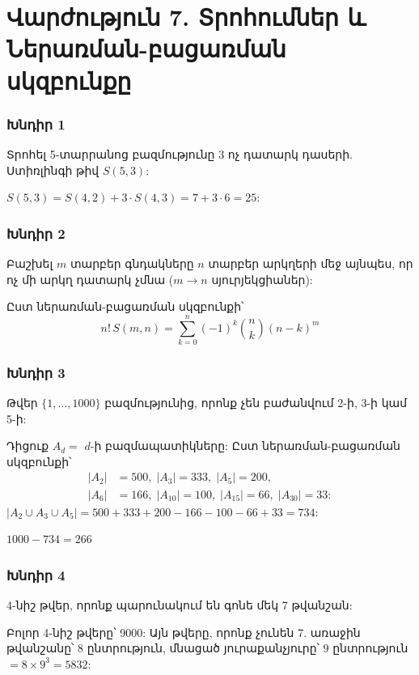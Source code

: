 
\section*{Վարժություն 7. Տրոհումներ և Ներառման-բացառման սկզբունքը}

\subsubsection*{Խնդիր 1}
Տրոհել 5-տարրանոց բազմությունը 3 ոչ դատարկ դասերի. Ստիռլինգի թիվ $S(5,3)$:

$S(5,3) = S(4,2)+3\cdot S(4,3) = 7 + 3\cdot 6 = \boxed{25}$:

\subsubsection*{Խնդիր 2}
Բաշխել $m$ տարբեր գնդակները $n$ տարբեր արկղերի մեջ այնպես, որ ոչ մի արկղ դատարկ չմնա ($m\to n$ սյուրյեկցիաներ):

Ըստ ներառման-բացառման սկզբունքի՝
\[
  \boxed{n!\,S(m,n) = \sum_{k=0}^{n}(-1)^k\binom{n}{k}(n-k)^m}
\]

\subsubsection*{Խնդիր 3}
Թվեր $\{1,\dots,1000\}$ բազմությունից, որոնք չեն բաժանվում 2-ի, 3-ի կամ 5-ի:

Դիցուք $A_d = $ $d$-ի բազմապատիկները: Ըստ ներառման-բացառման սկզբունքի՝
\begin{align*}
|A_2|&=500,\; |A_3|=333,\; |A_5|=200,\\
|A_6|&=166,\; |A_{10}|=100,\; |A_{15}|=66,\; |A_{30}|=33:
\end{align*}
$|A_2\cup A_3\cup A_5|=500+333+200-166-100-66+33=734$:

$\boxed{1000-734=266}$

\subsubsection*{Խնդիր 4}
4-նիշ թվեր, որոնք պարունակում են գոնե մեկ 7 թվանշան:

Բոլոր 4-նիշ թվերը՝ 9000: Այն թվերը, որոնք չունեն 7. առաջին թվանշանը՝ $8$ ընտրություն, մնացած յուրաքանչյուրը՝ $9$ ընտրություն $= 8\times 9^3 = 5832$:

